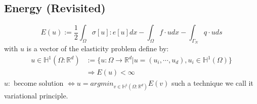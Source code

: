 \documentclass[a4paper,12pt]{article}
\newcommand{\R}{\mathbb{R}}
\newcommand{\Hspace}{\mathbb{H}}
\begin{document}
\subsection{Energy (Revisited)}
\begin{equation}
E(u) := \frac{1}{2}\int_\Omega \sigma[u]:e[u]dx -\int_\Omega f\cdot u dx -\int_{\Gamma_N} q\cdot u ds
\end{equation}
with $u$ is a vector of the elasticity problem define by:
\begin{equation}\nonumber
\begin{aligned}
u\in\Hspace^1(\Omega:\R^d) &:= \{ u:\Omega \rightarrow\R^d |u=(u_i, \cdots, u_d), u_i\in\Hspace^1(\Omega) \}\\
&\Rightarrow E(u) < \infty
\end{aligned}
\end{equation}
$u:$ become solution $\Leftrightarrow u = argmin_{v\in\Hspace^1(\Omega:\R^d)}E(v)$
such a technique we call it variational principle.
\end{document}
